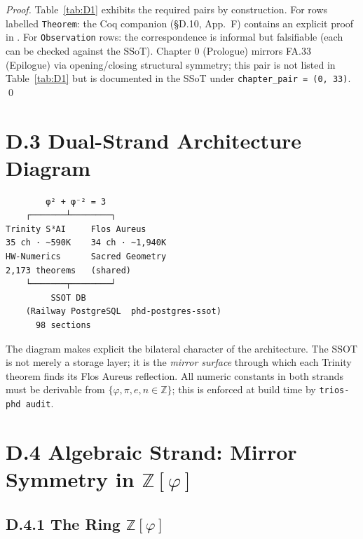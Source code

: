 \begin{proof}
Table~\ref{tab:D1} exhibits the required pairs by construction.
For rows labelled \texttt{Theorem}: the Coq companion (\S D.10, App.~F) contains
an explicit proof in .
For \texttt{Observation} rows: the correspondence is informal but falsifiable
(each can be checked against the SSoT).
Chapter 0 (Prologue) mirrors FA.33 (Epilogue) via opening/closing structural
symmetry; this pair is not listed in Table~\ref{tab:D1} but is documented in the
SSoT under \texttt{chapter\_pair = (0, 33)}.
\qed
\end{proof}

\section*{D.3  Dual-Strand Architecture Diagram}

\begin{verbatim}
        φ² + φ⁻² = 3
    ┌───────┴────────┐
Trinity S³AI     Flos Aureus
35 ch · ~590K    34 ch · ~1,940K
HW-Numerics      Sacred Geometry
2,173 theorems   (shared)
    └───────┬────────┘
         SSOT DB
    (Railway PostgreSQL  phd-postgres-ssot)
      98 sections
\end{verbatim}

\noindent The diagram makes explicit the bilateral character of the architecture.
The SSOT is not merely a storage layer; it is the \emph{mirror surface} through
which each Trinity theorem finds its Flos Aureus reflection.
All numeric constants in both strands must be derivable from
$\{\varphi, \pi, e, n\in\mathbb{Z}\}$; this is enforced at build time by
\texttt{trios-phd audit}.

\section*{D.4  Algebraic Strand: Mirror Symmetry in $\mathbb{Z}[\varphi]$}

\subsection*{D.4.1  The Ring $\mathbb{Z}[\varphi]$}

